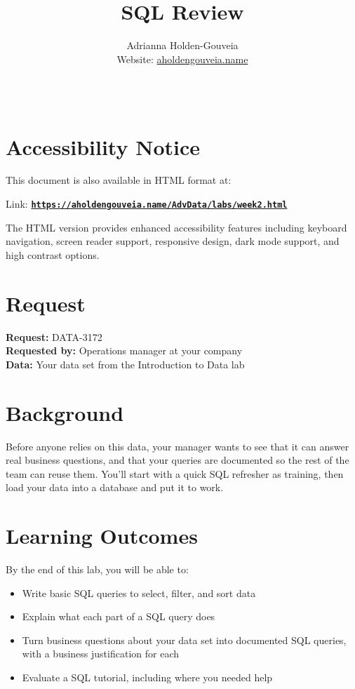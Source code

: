 \documentclass[12pt]{article}
\title{SQL Review}
\author{
        Adrianna Holden-Gouveia \\
        Website: \href{https://aholdengouveia.name}{aholdengouveia.name}\\ 
        \date{\vspace{-5ex}}
        \faGithub {: aholdengouveia} \\
        }
\begin{document}
    

\maketitle



\section*{Accessibility Notice}
This document is also available in HTML format at:

Link: \href{https://aholdengouveia.name/AdvData/labs/week2.html}{\textbf{\nolinkurl{https://aholdengouveia.name/AdvData/labs/week2.html}}}

The HTML version provides enhanced accessibility features including keyboard navigation, screen reader support, responsive design, dark mode support, and high contrast options.

\section*{Request}
\noindent\textbf{Request:} DATA-3172\\
\textbf{Requested by:} Operations manager at your company\\
\textbf{Data:} Your data set from the Introduction to Data lab

\section*{Background}
Before anyone relies on this data, your manager wants to see that it can answer real business questions, and that your queries are documented so the rest of the team can reuse them. You'll start with a quick SQL refresher as training, then load your data into a database and put it to work.

\section*{Learning Outcomes}
By the end of this lab, you will be able to:
\begin{itemize}
    \item Write basic SQL queries to select, filter, and sort data
    \item Explain what each part of a SQL query does
    \item Turn business questions about your data set into documented SQL queries, with a business justification for each
    \item Evaluate a SQL tutorial, including where you needed help
\end{itemize}
\end{document}
